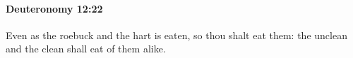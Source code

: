 
		\paragraph{Deuteronomy 12:22} %
			\label{DEUTERONOMY-12-22}

			Even as the roebuck and the hart is eaten, so thou shalt eat them: the unclean and the clean shall eat of them alike.


